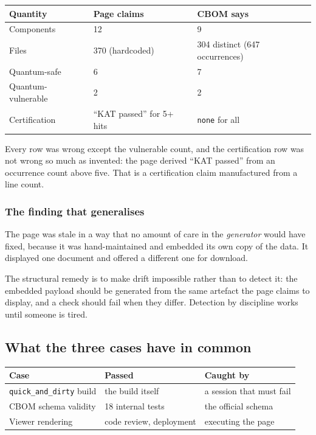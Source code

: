 \begin{center}
\begin{tabular}{@{}lll@{}}
\toprule
Quantity & Page claims & CBOM says \\
\midrule
Components & 12 & 9 \\
Files & 370 (hardcoded) & 304 distinct (647 occurrences) \\
Quantum-safe & 6 & 7 \\
Quantum-vulnerable & 2 & 2 \\
Certification & ``KAT passed'' for 5+ hits & \texttt{none} for all \\
\bottomrule
\end{tabular}
\end{center}

Every row was wrong except the vulnerable count, and the certification row was
not wrong so much as invented: the page derived ``KAT passed'' from an occurrence
count above five. That is a certification claim manufactured from a line count.

\subsubsection{The finding that generalises}

The page was stale in a way that no amount of care in the \emph{generator} would
have fixed, because it was hand-maintained and embedded its own copy of the data.
It displayed one document and offered a different one for download.

The structural remedy is to make drift impossible rather than to detect it: the
embedded payload should be generated from the same artefact the page claims to
display, and a check should fail when they differ. Detection by discipline works
until someone is tired.

\subsection{What the three cases have in common}
\label{sec:case-study-common}

\begin{center}
\begin{tabular}{@{}p{3.1cm}p{4.3cm}p{4.6cm}@{}}
\toprule
Case & Passed & Caught by \\
\midrule
\texttt{quick\_and\_dirty} build & the build itself & a session that must fail \\
CBOM schema validity & 18 internal tests & the official schema \\
Viewer rendering & code review, deployment & executing the page \\
\bottomrule
\end{tabular}
\end{center}

